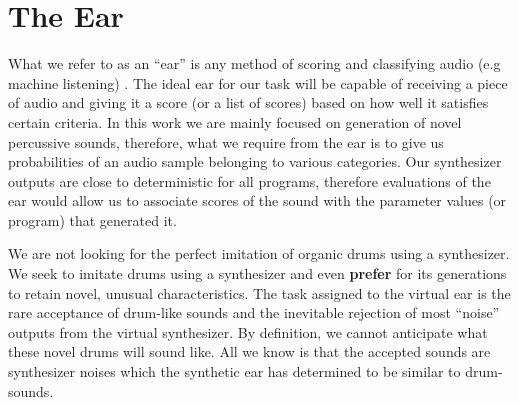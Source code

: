 \documentclass[\main/thesis.tex]{subfiles}
\begin{document}
\section{The Ear}
\label{sec:ear}
What we refer to as an \enquote{ear} is any method of scoring and classifying audio (e.g machine listening) \cite{malkin2006machine,rowe1992interactive}. The ideal ear for our task will be capable of receiving a piece of audio and giving it a score (or a list of scores) based on how well it satisfies certain criteria. In this work we are mainly focused on generation of novel percussive sounds, therefore, what we require from the ear is to give us probabilities of an audio sample belonging to various categories. Our synthesizer outputs are close to deterministic for all programs, therefore evaluations of the ear would allow us to associate scores of the sound with the parameter values (or program) that generated it.

We are not looking for the perfect imitation of organic drums using a synthesizer. We seek to imitate drums using a synthesizer and even \textbf{prefer} for its generations to retain novel, unusual characteristics. The task assigned to the virtual ear is the rare acceptance of drum-like sounds and the inevitable rejection of most \enquote{noise} outputs from the virtual synthesizer. By definition, we cannot anticipate what these novel drums will sound like. All we know is that the accepted sounds are synthesizer noises which the synthetic ear has determined to be similar to drum-sounds. 
\end{document}
